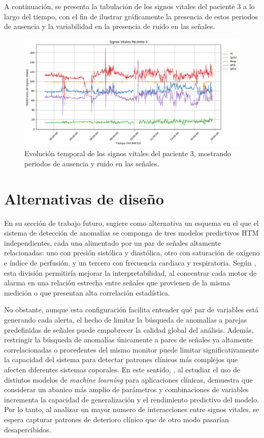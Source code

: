 A continuación, se presenta la tabulación de los signos vitales del paciente 3 a lo largo del tiempo, con el fin de ilustrar gráficamente la presencia de estos periodos de ausencia y la variabilidad en la presencia de ruido en las señales.

\begin{figure}[H]
  \centering
  \includegraphics[width=\textwidth]{Images/SignosVitalesPaciente3.png}
  \caption{Evolución temporal de los signos vitales del paciente 3, mostrando periodos de ausencia y ruido en las señales.}
  \label{fig:signos_vitales_paciente3}
\end{figure}

\section{Alternativas de diseño}

En su sección de trabajo futuro, \textcite{Vargas2023} sugiere como alternativa un esquema en el que el sistema de detección de anomalías se componga de tres modelos predictivos HTM independientes, cada uno alimentado por un par de señales altamente relacionadas: uno con presión sistólica y diastólica, otro con saturación de oxígeno e índice de perfusión, y un tercero con frecuencia cardiaca y respiratoria. Según \textcite{Vargas2023}, esta división permitiría mejorar la interpretabilidad, al concentrar cada motor de alarma en una relación estrecha entre señales que provienen de la misma medición o que presentan alta correlación estadística.

No obstante, aunque esta configuración facilita entender qué par de variables está generando cada alerta, el hecho de limitar la búsqueda de anomalías a parejas predefinidas de señales puede empobrecer la calidad global del análisis. Además, restringir la búsqueda de anomalías únicamente a pares de señales ya altamente correlacionadas o procedentes del mismo monitor puede limitar significativamente la capacidad del sistema para detectar patrones clínicos más complejos que afecten diferentes sistemas coporales. En este sentido, \textcite{Pieroni2023}, al estudiar el uso de distintos modelos de \textit{machine learning} para aplicaciones clínicas, demuestra que considerar un abanico más amplio de parámetros y combinaciones de variables incrementa la capacidad de generalización y el rendimiento predictivo del modelo. Por lo tanto, al analizar un mayor numero de interacciones entre signos vitales, se espera capturar patrones de deterioro clínico que de otro modo pasarían desapercibidos.

